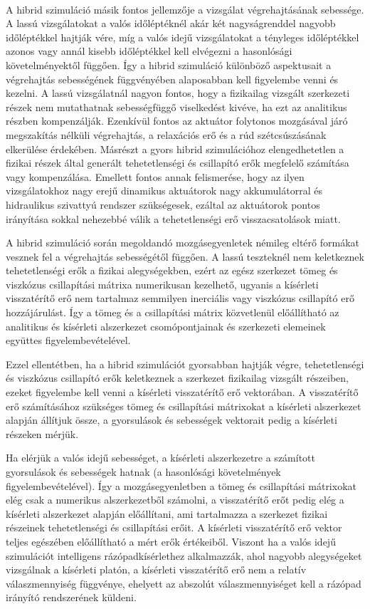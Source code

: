 {\ }

A hibrid szimuláció másik fontos jellemzője  a vizsgálat végrehajtásának sebessége. A lassú vizsgálatokat a valós időléptéknél  akár két nagyságrenddel nagyobb időléptékkel hajtják vére,  míg a valós idejű vizsgálatokat a tényleges időléptékkel azonos vagy annál kisebb időléptékkel kell elvégezni a hasonlósági követelményektől függően. Így a hibrid szimuláció különböző aspektusait a végrehajtás sebességének függvényében alaposabban kell figyelembe venni és kezelni. A lassú vizsgálatnál nagyon fontos, hogy a fizikailag vizsgált szerkezeti részek nem mutathatnak sebességfüggő viselkedést kivéve, ha ezt az analitikus részben kompenzálják. Ezenkívül fontos az  aktuátor folytonos mozgásával járó megszakítás nélküli végrehajtás, a relaxációs erő és a rúd szétcsúszásának elkerülése érdekében. Másrészt a gyors hibrid szimulációhoz elengedhetetlen a fizikai részek által generált  tehetetlenségi és  csillapító erők megfelelő számítása vagy kompenzálása. Emellett fontos annak felismerése, hogy az ilyen vizsgálatokhoz nagy erejű dinamikus aktuátorok nagy akkumulátorral és hidraulikus szivattyú rendszer szükségesek, ezáltal az aktuátorok pontos irányítása sokkal nehezebbé válik a tehetetlenségi erő visszacsatolások miatt.

A hibrid szimuláció során megoldandó mozgásegyenletek némileg eltérő formákat vesznek fel a végrehajtás sebességétől függően. A lassú teszteknél nem keletkeznek tehetetlenségi erők a fizikai alegységekben, ezért az egész szerkezet tömeg és viszkózus csillapítási mátrixa numerikusan kezelhető, ugyanis a kísérleti visszatérítő erő  nem tartalmaz semmilyen inerciális vagy viszkózus csillapító erő hozzájárulást.  Így a tömeg és a csillapítási mátrix közvetlenül előállítható  az analitikus és kísérleti alszerkezet  csomópontjainak és szerkezeti elemeinek együttes figyelembevételével. 
 
Ezzel ellentétben, ha a hibrid szimulációt gyorsabban hajtják végre,  tehetetlenségi és viszkózus csillapító erők keletkeznek a szerkezet fizikailag vizsgált részeiben, ezeket figyelembe kell venni a kísérleti visszatérítő erő vektorában. A visszatérítő erő számításához szükséges tömeg és csillapítási mátrixokat a kísérleti alszerkezet alapján állítjuk össze, a gyorsulások és sebességek vektorait pedig a kísérleti részeken mérjük.

Ha elérjük a valós idejű sebességet, a kísérleti alszerkezetre a  számított gyorsulások és sebességek hatnak (a hasonlósági követelmények figyelembevételével). Így a mozgásegyenletben a tömeg és csillapítási mátrixokat elég csak a numerikus alszerkezetből számolni, a visszatérítő erőt pedig elég a kísérleti alszerkezet alapján előállítani, ami tartalmazza a szerkezet fizikai részeinek tehetetlenségi és csillapítási erőit. A kísérleti visszatérítő erő vektor teljes egészében előállítható a mért erők értékeiből. Viszont ha a valós idejű szimulációt intelligens rázópadkísérlethez alkalmazzák, ahol  nagyobb alegységeket vizsgálnak a kísérleti platón, a kísérleti visszatérítő erő nem a relatív válaszmennyiség függvénye, ehelyett az abszolút válaszmennyiséget kell a rázópad irányító rendszerének küldeni.  



